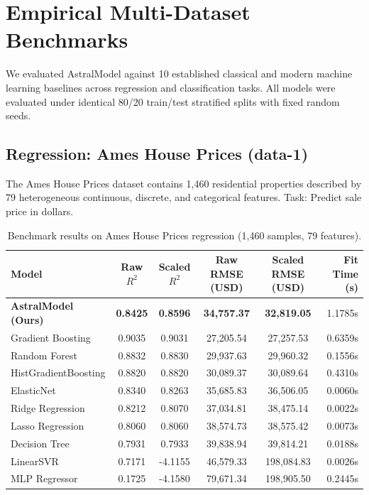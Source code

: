 \documentclass[11pt,a4paper]{article}
\begin{document}
\section{Empirical Multi-Dataset Benchmarks}

We evaluated AstralModel against 10 established classical and modern machine learning baselines across regression and classification tasks. All models were evaluated under identical 80/20 train/test stratified splits with fixed random seeds.

\subsection{Regression: Ames House Prices (data-1)}

The Ames House Prices dataset contains 1,460 residential properties described by 79 heterogeneous continuous, discrete, and categorical features. Task: Predict sale price in dollars.

\begin{table}[h]
\centering
\small
\caption{Benchmark results on Ames House Prices regression (1,460 samples, 79 features).}
\label{tab:ames}
\begin{tabular}{lccccr}
\toprule
\textbf{Model} & \textbf{Raw $R^2$} & \textbf{Scaled $R^2$} & \textbf{Raw RMSE (USD)} & \textbf{Scaled RMSE (USD)} & \textbf{Fit Time (s)} \\
\midrule
\textbf{AstralModel (Ours)} & \textbf{0.8425} & \textbf{0.8596} & \textbf{34,757.37} & \textbf{32,819.05} & 1.1785s \\
Gradient Boosting & 0.9035 & 0.9031 & 27,205.54 & 27,257.53 & 0.6359s \\
Random Forest & 0.8832 & 0.8830 & 29,937.63 & 29,960.32 & 0.1556s \\
HistGradientBoosting & 0.8820 & 0.8820 & 30,089.37 & 30,089.64 & 0.4310s \\
ElasticNet & 0.8340 & 0.8263 & 35,685.83 & 36,506.05 & 0.0060s \\
Ridge Regression & 0.8212 & 0.8070 & 37,034.81 & 38,475.14 & 0.0022s \\
Lasso Regression & 0.8060 & 0.8060 & 38,574.73 & 38,575.42 & 0.0073s \\
Decision Tree & 0.7931 & 0.7933 & 39,838.94 & 39,814.21 & 0.0188s \\
LinearSVR & 0.7171 & -4.1155 & 46,579.33 & 198,084.83 & 0.0026s \\
MLP Regressor & 0.1725 & -4.1580 & 79,671.34 & 198,905.50 & 0.2445s \\
\bottomrule
\end{tabular}
\end{table}
\end{document}

